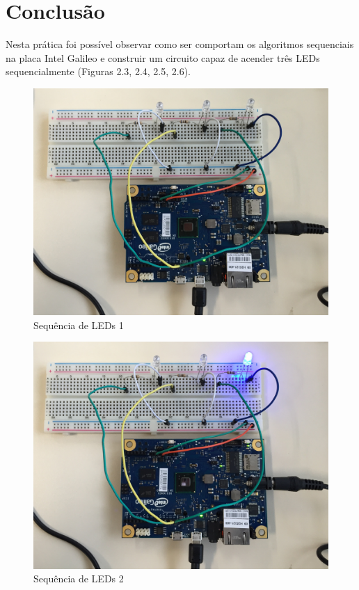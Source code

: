 \section{Conclusão}
\label{sec:4}
Nesta prática foi possível observar como ser comportam os algoritmos sequenciais na placa Intel Galileo e construir um circuito capaz de acender três LEDs sequencialmente (Figuras 2.3, 2.4, 2.5, 2.6).

\begin{figure}[h]
\centering
\includegraphics[scale=0.05]{chapter2/real1.jpg}
\caption{Sequência de LEDs 1}
\label{fig:3}
\end{figure}
\begin{figure}[h]
\centering
\includegraphics[scale=0.05]{chapter2/real2.jpg}
\caption{Sequência de LEDs 2}
\label{fig:4}
\end{figure}
